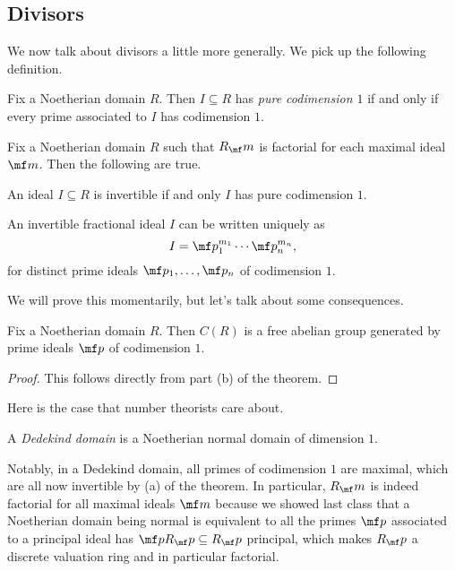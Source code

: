 \documentclass[../notes.tex]{subfiles}
\begin{document}
\subsection{Divisors}
We now talk about divisors a little more generally. We pick up the following definition.
\begin{definition}
	Fix a Noetherian domain $R$. Then $I\subseteq R$ has \textit{pure codimension $1$} if and only if every prime associated to $I$ has codimension $1$.
\end{definition}
\begin{theorem} \label{thm:upfforideals}
	Fix a Noetherian domain $R$ such that $R_\mf m$ is factorial for each maximal ideal $\mf m$. Then the following are true.
	\begin{listalph}
		\item An ideal $I\subseteq R$ is invertible if and only $I$ has pure codimension $1$.
		\item An invertible fractional ideal $I$ can be written uniquely as
		\[I=\mf p_1^{m_1}\cdots\mf p_n^{m_n},\]
		for distinct prime ideals $\mf p_1,\ldots,\mf p_n$ of codimension $1$.
	\end{listalph}
\end{theorem}
We will prove this momentarily, but let's talk about some consequences.
\begin{corollary}
	Fix a Noetherian domain $R$. Then $C(R)$ is a free abelian group generated by prime ideals $\mf p$ of codimension $1$.
\end{corollary}
\begin{proof}
	This follows directly from part (b) of the theorem.
\end{proof}
Here is the case that number theorists care about.
\begin{definition}[Dedekind]
	A \textit{Dedekind domain} is a Noetherian normal domain of dimension $1$.
\end{definition}
Notably, in a Dedekind domain, all primes of codimension $1$ are maximal, which are all now invertible by (a) of the theorem. In particular, $R_\mf m$ is indeed factorial for all maximal ideals $\mf m$ because we showed last class that a Noetherian domain being normal is equivalent to all the primes $\mf p$ associated to a principal ideal has $\mf pR_\mf p\subseteq R_\mf p$ principal, which makes $R_\mf p$ a discrete valuation ring and in particular factorial.
\end{document}
